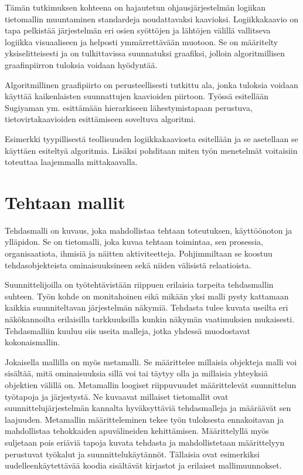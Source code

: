 \documentclass[finnish,12pt]{article}
\begin{document}
Tämän tutkimuksen kohteena on hajautetun ohjausjärjestelmän logiikan tietomallin muuntaminen standardeja noudattavaksi kaavioksi.
Logiikkakaavio on tapa pelkistää järjestelmän eri osien syöttöjen ja lähtöjen välillä vallitseva logiikka visuaaliseen ja helposti ymmärrettävään muotoon.
Se on määritelty yksiselitteisesti ja on tulkittavissa suunnatuksi graafiksi, jolloin algoritmillisen graafinpiirron tuloksia voidaan hyödyntää.

Algoritmillinen graafipiirto on perusteellisesti tutkittu ala, jonka tuloksia voidaan käyttää kaikenlaisten suunnattujen kaavioiden piirtoon.
Työssä esitellään Sugiyaman ym. \cite{RefWorks:9} esittämään hierarkiseen lähestymistapaan perustuva, tietovirtakaavioiden esittämiseen soveltuva algoritmi.

Esimerkki tyypillisestä teollisuuden logiikkakaaviosta esitellään ja se asetellaan se käyttäen esiteltyä algoritmia.
Lisäksi pohditaan miten työn menetelmät voitaisiin toteuttaa laajemmalla mittakaavalla.

	\clearpage
	\section{Tehtaan mallit}

Tehdasmalli on kuvaus, joka mahdollistaa tehtaan toteutuksen, käyttöönoton ja ylläpidon. Se on tietomalli, joka kuvaa tehtaan toimintaa, sen prosessia, organisaatiota, ihmisiä ja näitten aktiviteetteja.
Pohjimmiltaan se koostuu tehdasobjekteista ominaisuuksineen sekä niiden välisistä relaatioista. \cite{RefWorks:41}

Suunnittelijoilla on työtehtävistään riippuen erilaisia tarpeita tehdasmallin suhteen.
Työn kohde on monitahoinen eikä mikään yksi malli pysty kattamaan kaikkia suunniteltavan järjestelmän näkymiä.
Tehdasta tulee kuvata useilta eri näkökannoilta erilaisilla tarkkuuksilla kunkin näkymän vaatimuksien mukaisesti.
Tehdasmalliin kuuluu siis useita malleja, jotka yhdessä muodostavat kokonaismallin.

Jokaisella mallilla on myös metamalli. Se määrittelee millaisia objekteja malli voi sisältää, mitä ominaisuuksia sillä voi tai täytyy olla ja millaisia yhteyksiä objektien välillä on.
Metamallin loogiset riippuvuudet määrittelevät suunnittelun työtapoja ja järjestystä.
Ne kuvaavat millaiset tietomallit ovat suunnittelujärjestelmän kannalta hyväksyttäviä tehdasmalleja ja
määräävät sen laajuuden. Metamallin määritteleminen tekee työn tuloksesta ennakoitavan ja mahdollistaa tehokkaiden apuvälineiden kehittämisen.
Määrittelyllä myös suljetaan pois eriäviä tapoja kuvata tehdasta ja mahdollistetaan määrittelyyn perustuvat työkalut ja suunnittelukäytännöt.
Tällaisia ovat esimerkiksi uudelleenkäytettävää koodia sisältävät kirjastot ja erilaiset mallimuunnokset.
\end{document}

